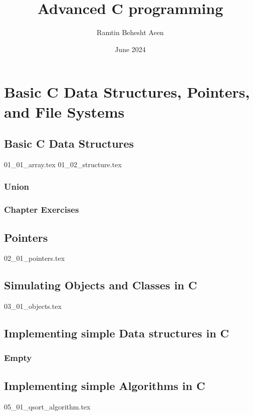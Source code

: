 \documentclass{book}
\title{Advanced C programming}
\author{Ramtin Behesht Aeen}
\date{June 2024}
\begin{document}
\maketitle
\tableofcontents

\part{ Basic C Data Structures, Pointers, and File Systems}
\chapter{Basic C Data Structures}
{01_01_array.tex}
{01_02_structure.tex}
\section{Union}
\section{Chapter Exercises}


\chapter{Pointers}
{02_01_pointers.tex}

\chapter{Simulating Objects and Classes in C}
{03_01_objects.tex}

\chapter{Implementing simple Data structures in C}
\section{Empty}

\chapter{Implementing  simple Algorithms in C}
{05_01_qsort_algorithm.tex}
\end{document}
